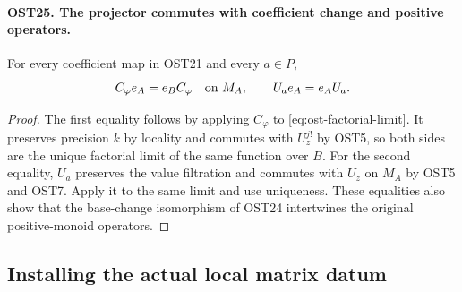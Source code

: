 \documentclass[11pt,a4paper]{article}
\numberwithin{equation}{section}
\theoremstyle{remark}\newtheorem{remark}[theorem]{Remark}
\begin{document}
\paragraph{OST25. The projector commutes with coefficient change and positive operators.}
\label{claim:OST25}
For every coefficient map in OST21 and every $a\in P$,
\[
 C_\varphi e_A=e_B C_\varphi\quad\hbox{on }M_A,
                  \qquad U_ae_A=e_AU_a.
\]
\begin{proof}
The first equality follows by applying $C_\varphi$ to
\eqref{eq:ost-factorial-limit}.  It preserves precision $k$
by locality and commutes with $U_z^{j!}$ by OST5, so both
sides are the unique factorial limit of the same function
over $B$.  For the second equality, $U_a$ preserves the
value filtration and commutes with $U_z$ on $M_A$ by OST5
and OST7.  Apply it to the same limit and use uniqueness.
These equalities also show that the base-change isomorphism
of OST24 intertwines the original positive-monoid operators.
\end{proof}

\subsection{Installing the actual local matrix datum}

\end{document}
